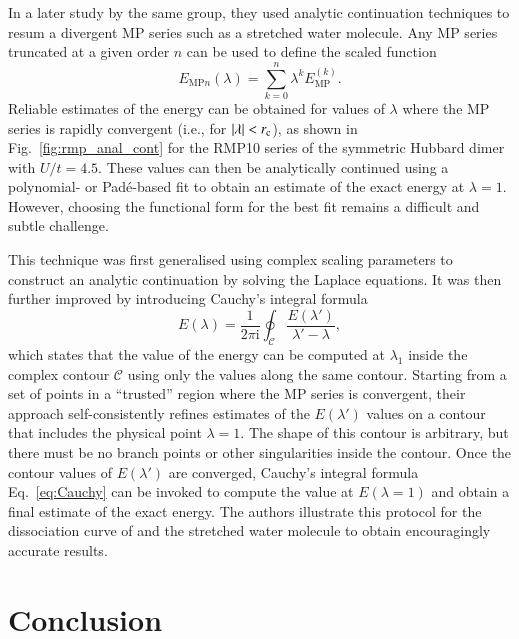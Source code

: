 \documentclass[aps,prb,reprint,noshowkeys,superscriptaddress]{revtex4-1}
\newcommand{\latin}[1]{#1}
\newcommand{\ie}{\latin{i.e.}}
\renewcommand{\i}{\mathrm{i}} %
\newcommand{\rc}{r_{\text{c}}}
\begin{document}
In a later study by the same group, they used analytic continuation techniques 
to resum a divergent MP series such as a stretched water molecule.\cite{Mihalka_2017a}
Any MP series truncated at a given order $n$ can be used to define the scaled function
\begin{equation}
   E_{\text{MP}n}(\lambda) = \sum_{k=0}^{n} \lambda^{k} E_\text{MP}^{(k)}.
\end{equation}
Reliable estimates of the energy can be obtained for values of $\lambda$ where the MP series is rapidly
convergent (\ie, for $\abs{\lambda} < \rc$), as shown in Fig.~\ref{fig:rmp_anal_cont} for the RMP10 series 
of the symmetric Hubbard dimer with $U/t = 4.5$.
These values can then be analytically continued using a polynomial- or Pad\'e-based fit to obtain an 
estimate of the exact energy at $\lambda = 1$.
However, choosing the functional form for the best fit remains a difficult and subtle challenge.

This technique was first generalised using complex scaling parameters to construct an analytic
continuation by solving the Laplace equations.\cite{Surjan_2018}
It was then further improved by introducing Cauchy's integral formula\cite{Mihalka_2019}
\begin{equation}
	\label{eq:Cauchy}
    E(\lambda) = \frac{1}{2\pi \i} \oint_{\mathcal{C}} \frac{E(\lambda')}{\lambda' - \lambda},
\end{equation}
which states that the value of the energy can be computed at $\lambda_1$ inside the complex 
contour $\mathcal{C}$ using only the values along the same contour.
Starting from a set of points in a ``trusted'' region where the MP series is convergent, their approach 
self-consistently refines estimates of the $E(\lambda')$ values on a contour that includes the physical point 
$\lambda = 1$.
The shape of this contour is arbitrary, but there must be no branch points or other singularities inside
the contour.
Once the contour values of $E(\lambda')$ are converged, Cauchy's integral formula Eq.~\eqref{eq:Cauchy} can 
be invoked to compute the value at $E(\lambda=1)$ and obtain a final estimate of the exact energy.
The authors illustrate this protocol for the dissociation curve of  and the stretched water 
molecule to obtain encouragingly accurate results.\cite{Mihalka_2019} 

\section{Conclusion}
\end{document}
